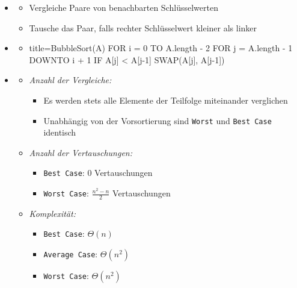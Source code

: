 \documentclass[
    ngerman,
    color=3b,
    load_common, %
    summary,
    boxarc,
]{tuda_summary}
\begin{document}
\begin{itemize}
    \item {}
          \begin{itemize}
              \item Vergleiche Paare von benachbarten Schlüsselwerten
              \item Tausche das Paar, falls rechter Schlüsselwert kleiner als linker
          \end{itemize}

    \item {}
          \begin{itemize}
              \item[]
                    \begin{codeBlock}[autogobble]{title=BubbleSort(A)}
                        FOR i = 0 TO A.length - 2
                            FOR j = A.length - 1 DOWNTO i + 1
                                IF A[j] < A[j-1]
                                    SWAP(A[j], A[j-1])
                    \end{codeBlock}
          \end{itemize}

    \item {}
          \begin{itemize}
              \item \textit{Anzahl der Vergleiche:}
                    \begin{itemize}
                        \item Es werden stets alle Elemente der Teilfolge miteinander verglichen
                        \item Unabhängig von der Vorsortierung sind \texttt{Worst} und \texttt{Best Case} identisch
                    \end{itemize}

              \item \textit{Anzahl der Vertauschungen:}
                    \begin{itemize}
                        \item \texttt{Best Case}: 0 Vertauschungen
                        \item \texttt{Worst Case}: $\frac{n^2-n}{2}$ Vertauschungen
                    \end{itemize}

              \item \textit{Komplexität:}
                    \begin{itemize}
                        \item \texttt{Best Case}: $\Theta(n)$
                        \item \texttt{Average Case}: $\Theta(n^2)$
                        \item \texttt{Worst Case}: $\Theta(n^2)$
                    \end{itemize}
          \end{itemize}

\end{itemize}
\clearpage
\end{document}
